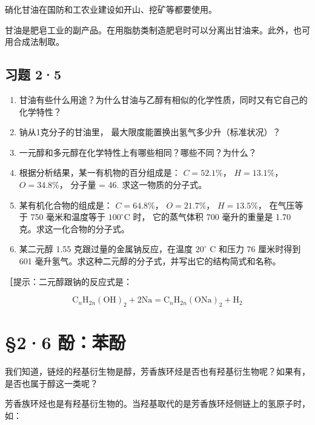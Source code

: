硝化甘油在国防和工农业建设如开山、挖矿等都要使用。

甘油是肥皂工业的副产品。在用脂肪类制造肥皂时可以分离出甘油来。此外，也可用合成法制取。

\subsection{习题 2·5}

\begin{enumerate}
\item
  甘油有些什么用途？为什么甘油与乙醇有相似的化学性质，同时又有它自己的化学特性？
\item
  钠从1克分子的甘油里， 最大限度能置换出氢气多少升（标准状况）？
\item
  一元醇和多元醇在化学特性上有哪些相同？哪些不同？为什么？
\item
  根据分析结果，某一有机物的百分组成是： \(C = 52.1\%\)，
  \(H = 13.1\%\)， \(O = 34.8\%\)， 分子量 = 46. 求这一物质的分子式。
\item
  某有机化合物的组成是： \(C = 64.8\%\)， \(O = 21.7\%\)，
  \(H = 13.5\%\)， 在气压等于 750 毫米和温度等于
  \(100^{\circ} \mathrm{C}\) 时， 它的蒸气体积 700 毫升的重量是 1.70
  克。求这一化合物的分子式。
\item
  某二元醇 1.55 克跟过量的金属钠反应，在温度 \(20^{\circ}\) C 和压力 76
  厘米时得到 601
  毫升氢气。求这种二元醇的分子式，并写出它的结构简式和名称。
\end{enumerate}

［提示：二元醇跟钠的反应式是：

\[
\mathrm{C}_{n}\mathrm{H}_{2n}(\mathrm{OH})_{2}+2\mathrm{Na}
=
\mathrm{C}_{n}\mathrm{H}_{2n}(\mathrm{ONa})_{2}+\mathrm{H}_{2}
\]

\section{§2·6 酚：苯酚}

我们知道，链烃的羟基衍生物是醇，芳香族环烃是否也有羟基衍生物呢？如果有，是否也属于醇这一类呢？

芳香族环烃也是有羟基衍生物的。当羟基取代的是芳香族环烃侧链上的氢原子时，如：

